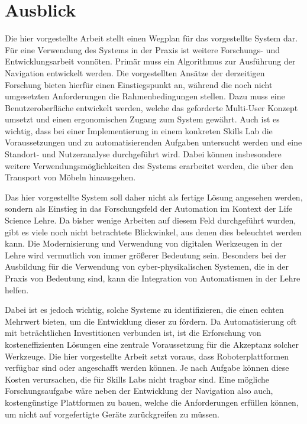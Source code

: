 \newpage \section{Ausblick}

Die hier vorgestellte Arbeit stellt einen Wegplan für das vorgestellte System dar. Für eine Verwendung des Systems in der Praxis ist weitere Forschungs- und Entwicklungsarbeit vonnöten. Primär muss ein Algorithmus zur Ausführung der Navigation entwickelt werden. Die vorgestellten Ansätze der derzeitigen Forschung bieten hierfür einen Einstiegspunkt an, während die noch nicht umgesetzten Anforderungen die Rahmenbedingungen stellen. Dazu muss eine Benutzeroberfläche entwickelt werden, welche das geforderte Multi-User Konzept umsetzt und einen ergonomischen Zugang zum System gewährt. Auch ist es wichtig, dass bei einer Implementierung in einem konkreten Skills Lab die Voraussetzungen und zu automatisierenden Aufgaben untersucht werden und eine Standort- und Nutzeranalyse durchgeführt wird. Dabei können insbesondere weitere Verwendungsmöglichkeiten des Systems erarbeitet werden, die über den Transport von Möbeln hinausgehen.

Das hier vorgestellte System soll daher nicht als fertige Lösung angesehen werden, sondern als Einstieg in das Forschungsfeld der Automation im Kontext der Life Science Lehre. Da bisher wenige Arbeiten auf diesem Feld durchgeführt wurden, gibt es viele noch nicht betrachtete Blickwinkel, aus denen dies beleuchtet werden kann. Die Modernisierung und Verwendung von digitalen Werkzeugen in der Lehre wird vermutlich von immer größerer Bedeutung sein. Besonders bei der Ausbildung für die Verwendung von cyber-physikalischen Systemen, die in der Praxis von Bedeutung sind, kann die Integration von Automatismen in der Lehre helfen.

Dabei ist es jedoch wichtig, solche Systeme zu identifizieren, die einen echten Mehrwert bieten, um die Entwicklung dieser zu fördern. Da Automatisierung oft mit beträchtlichen Investitionen verbunden ist, ist die Erforschung von kosteneffizienten Lösungen eine zentrale Voraussetzung für die Akzeptanz solcher Werkzeuge. Die hier vorgestellte Arbeit setzt voraus, dass Roboterplattformen verfügbar sind oder angeschafft werden können. Je nach Aufgabe können diese Kosten verursachen, die für Skills Labs nicht tragbar sind. Eine mögliche Forschungsaufgabe wäre neben der Entwicklung der Navigation also auch, kostengünstige Plattformen zu bauen, welche die Anforderungen erfüllen können, um nicht auf vorgefertigte Geräte zurückgreifen zu müssen.


